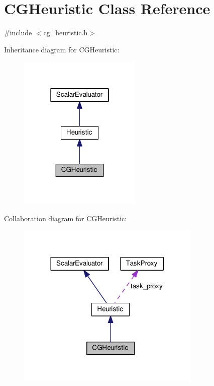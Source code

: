 \hypertarget{classCGHeuristic}{\section{C\-G\-Heuristic Class Reference}
\label{classCGHeuristic}
}


{\ttfamily \#include $<$cg\-\_\-heuristic.\-h$>$}



Inheritance diagram for C\-G\-Heuristic\-:
\nopagebreak
\begin{figure}[H]
\begin{center}
\leavevmode
\includegraphics[width=166pt]{classCGHeuristic__inherit__graph}
\end{center}
\end{figure}


Collaboration diagram for C\-G\-Heuristic\-:
\nopagebreak
\begin{figure}[H]
\begin{center}
\leavevmode
\includegraphics[width=248pt]{classCGHeuristic__coll__graph}
\end{center}
\end{figure}
